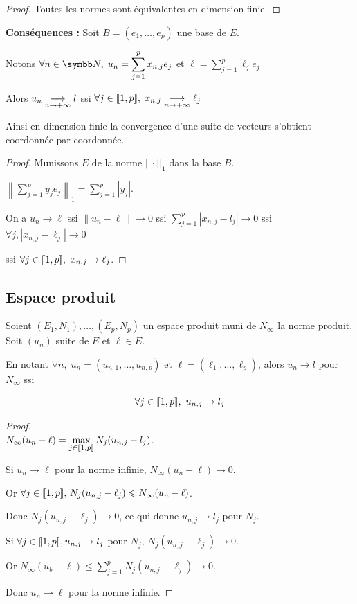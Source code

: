 \begin{proof}
    Toutes les normes sont équivalentes en dimension finie. 
\end{proof}

\textbf{Conséquences :}
Soit $B = (e_1, \dots, e_p)$ une base de $E$.

Notons $\displaystyle  \forall n \in \N, \; u_n = \sum_{j = 1}^{p} x_{n, j} e_j$
et $\displaystyle \ell = \sum_{j = 1}^{p} \ell_j e_j$

Alors $u_n \underset{n \to + \infty}{\longrightarrow} l$ ssi $\forall j \in [\![1, p]\!], \; x_{n, j} \underset{n \to + \infty}{\longrightarrow} \ell_j$

Ainsi en dimension finie la convergence d'une suite de vecteurs s'obtient coordonnée par coordonnée. 

\begin{proof}
    Munissons $E$ de la norme $||\cdot||_1$ dans la base $B$. 

    $\displaystyle \left\|\sum_{j =  1}^{p} y_je_j\right\|_1 = \sum_{j = 1}^{p} |y_j|$.

    On a $u_n \to \ell$ ssi $\| u_n - \ell\| \to 0$ ssi 
    $\displaystyle \sum_{j = 1}^{p }|x_{n, j} - l_j| \to 0$ ssi 
    $\forall j, |x_{n, j} - \ell_j| \to 0$

    ssi $\forall j \in [\![1, p]\!],~x_{n, j} \to \ell_j$. 
\end{proof}

\subsection{Espace produit}
\begin{definition}{}{}
    Soient $(E_1, N_1), \dots, (E_p, N_p)$ un espace produit muni de $N_\infty$ la norme produit. 
    Soit $(u_n)$ suite de $E$ et $\ell \in E$.

    En notant $\forall n, \; u_n = (u_{n, 1}, \dots, u_{n, p})$ et $\ell = (\ell_1, \dots, \ell_p)$, 
    alors $u_n \to l$ pour $N_\infty$ ssi

    \[\forall j \in [\![1, p]\!],~u_{n, j} \to l_j\]
\end{definition}

\begin{proof}~\\
    $\displaystyle N_\infty(u_n - \ell) = \max_{j \in [\![1, p]\!]} N_j(u_{n, j} - l_j)$.

    Si $u_n \to \ell$ pour la norme infinie, $N_\infty(u_n - \ell) \to 0$.

    Or $\forall j \in [\![1, p]\!], \, N_j(u_{n, j}- \ell_j) \leqslant N_\infty(u_n - \ell)$.

    Donc $N_j(u_{n, j} - \ell_j) \to 0$,
    ce qui donne $u_{n, j} \to l_j$ pour $N_j$.

    Si $\forall j \in [\![1, p]\!], u_{n, j} \to l_j$ pour $N_j$, $N_j(u_{n, j} - \ell_j) \to 0$.

    Or $\displaystyle N_\infty(u_b - \ell) \leqslant \sum_{j = 1}^{p } N_j(u_{n, j} - \ell_j) \to 0$.

    Donc $u_n \to \ell$ pour la norme infinie. 
\end{proof}

